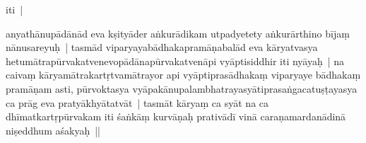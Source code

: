 \documentclass[article,12pt,a4paper]{memoir}%
\newcounter{parCount}
\begin{document}
	  
	  
	    \pstart  \leavevmode%
	    \hphantom{.}
	   iti | 
	{}
	\pend%
      

	  \pstart \leavevmode%
	anyathānupādānād eva kṣityāder aṅkurādikam utpadyetety aṅkurārthino bījaṃ nānusareyuḥ | tasmād viparyayabādhakapramāṇabalād eva kāryatvasya hetumātrapūrvakatvenevopādānapūrvakatvenāpi vyāptisiddhir iti nyāyaḥ | na caivaṃ kāryamātrakartṛtvamātrayor api vyāptiprasādhakaṃ viparyaye bādhakaṃ pramāṇam asti, pūrvoktasya vyāpakānupalambhatrayasyātiprasaṅgacatuṣṭayasya ca prāg eva pratyākhyātatvāt | tasmāt kāryaṃ ca syāt na ca dhīmatkartṛpūrvakam iti śaṅkāṃ kurvāṇaḥ prativādī vinā caraṇamardanādinā niṣeddhum aśakyaḥ ||
	{}
	\pend%
      
\end{document}
